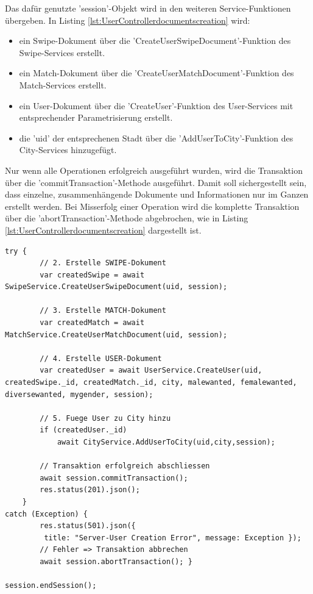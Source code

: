 \noindent
Das dafür genutzte 'session'-Objekt wird in den weiteren Service-Funktionen übergeben. In Listing \ref{lst:UserControllerdocumentscreation} wird:
\begin{itemize}
\item ein Swipe-Dokument über die 'CreateUserSwipeDocument'-Funktion des Swipe-Services erstellt.
\item ein Match-Dokument über die 'CreateUserMatchDocument'-Funktion des Match-Services erstellt. 
\item ein User-Dokument über die 'CreateUser'-Funktion des User-Services mit entsprechender Parametrisierung erstellt.
\item die 'uid' der entsprechenen Stadt über die 'AddUserToCity'-Funktion des City-Services hinzugefügt.
 \end{itemize}
Nur wenn alle Operationen erfolgreich ausgeführt wurden, wird die Transaktion über die 'commit\-Transaction'-Methode ausgeführt. Damit soll sichergestellt sein, dass einzelne, zusammenhängende Dokumente und Informationen nur im Ganzen erstellt werden. Bei Misserfolg einer Operation wird die komplette Transaktion über die 'abortTransaction'-Methode abgebrochen, wie in Listing \ref{lst:UserControllerdocumentscreation} dargestellt ist.\\

\begin{lstlisting}[caption=UserController - Create User - Dokumente erstellen, label=lst:UserControllerdocumentscreation]
try {
        // 2. Erstelle SWIPE-Dokument
        var createdSwipe = await SwipeService.CreateUserSwipeDocument(uid, session);

        // 3. Erstelle MATCH-Dokument
        var createdMatch = await MatchService.CreateUserMatchDocument(uid, session);

        // 4. Erstelle USER-Dokument
        var createdUser = await UserService.CreateUser(uid, createdSwipe._id, createdMatch._id, city, malewanted, femalewanted, diversewanted, mygender, session);

        // 5. Fuege User zu City hinzu
        if (createdUser._id)
            await CityService.AddUserToCity(uid,city,session);
            
        // Transaktion erfolgreich abschliessen
        await session.commitTransaction();
        res.status(201).json();
    }
catch (Exception) {
        res.status(501).json({
         title: "Server-User Creation Error", message: Exception });
        // Fehler => Transaktion abbrechen
        await session.abortTransaction(); }
        
session.endSession();
\end{lstlisting}
   

